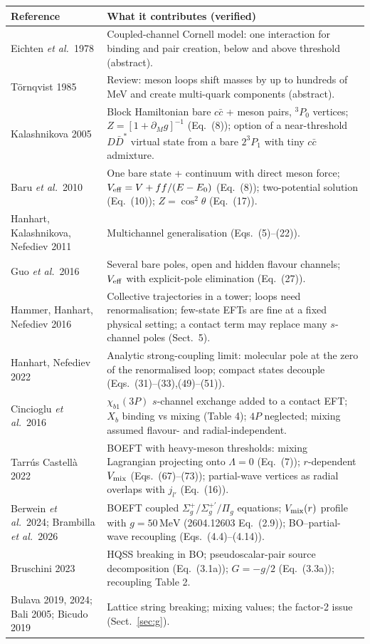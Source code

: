 \documentclass[11pt,a4paper]{article}
\newcommand{\MeV}{\,\mathrm{MeV}}
\begin{document}
\begin{center}
\small
\begin{tabular}{>{\raggedright\arraybackslash}p{3.5cm}>{\raggedright\arraybackslash}p{11.6cm}}
\toprule
Reference & What it contributes (verified) \\
\midrule
Eichten \emph{et al.}\ 1978 & Coupled-channel Cornell model: one interaction for binding and pair creation, below and above threshold (abstract).\\
T\"ornqvist 1985 & Review: meson loops shift masses by up to hundreds of MeV and create multi-quark components (abstract).\\
Kalashnikova 2005 & Block Hamiltonian bare $c\bar c$ + meson pairs, $^3P_0$ vertices; $Z=[1+\partial_Mg]^{-1}$ (Eq.~(8)); option of a near-threshold $D\bar D^*$ virtual state from a bare $2^3P_1$ with tiny $c\bar c$ admixture.\\
Baru \emph{et al.}\ 2010 & One bare state + continuum with direct meson force; $V_{\rm eff}=V+ff/(E-E_0)$ (Eq.~(8)); two-potential solution (Eq.~(10)); $Z=\cos^2\theta$ (Eq.~(17)).\\
Hanhart, Kalashnikova, Nefediev 2011 & Multichannel generalisation (Eqs.~(5)--(22)).\\
Guo \emph{et al.}\ 2016 & Several bare poles, open and hidden flavour channels; $V_{\rm eff}$ with explicit-pole elimination (Eq.~(27)).\\
Hammer, Hanhart, Nefediev 2016 & Collective trajectories in a tower; loops need renormalisation; few-state EFTs are fine at a fixed physical setting; a contact term may replace many $s$-channel poles (Sect.~5).\\
Hanhart, Nefediev 2022 & Analytic strong-coupling limit: molecular pole at the zero of the renormalised loop; compact states decouple (Eqs.~(31)--(33),(49)--(51)).\\
Cincioglu \emph{et al.}\ 2016 & $\chi_{b1}(3P)$ $s$-channel exchange added to a contact EFT; $X_b$ binding vs mixing (Table 4); $4P$ neglected; mixing assumed flavour- and radial-independent.\\
Tarr\'us Castell\`a 2022 & BOEFT with heavy-meson thresholds: mixing Lagrangian projecting onto $\Lambda=0$ (Eq.~(7)); $r$-dependent $V_{\rm mix}$ (Eqs.~(67)--(73)); partial-wave vertices as radial overlaps with $j_{l'}$ (Eq.~(16)).\\
Berwein \emph{et al.}\ 2024; Brambilla \emph{et al.}\ 2026 & BOEFT coupled $\Sigma_g^+/\Sigma_g^{+\prime}/\Pi_g$ equations; $V_{\rm mix}(r)$ profile with $g=50\MeV$ (2604.12603 Eq.~(2.9)); BO--partial-wave recoupling (Eqs.~(4.4)--(4.14)).\\
Bruschini 2023 & HQSS breaking in BO; pseudoscalar-pair source decomposition (Eq.~(3.1a)); $G=-g/2$ (Eq.~(3.3a)); recoupling Table 2.\\
Bulava 2019, 2024; Bali 2005; Bicudo 2019 & Lattice string breaking; mixing values; the factor-2 issue (Sect.~\ref{sec:g}).\\
\bottomrule
\end{tabular}
\end{center}
\end{document}
